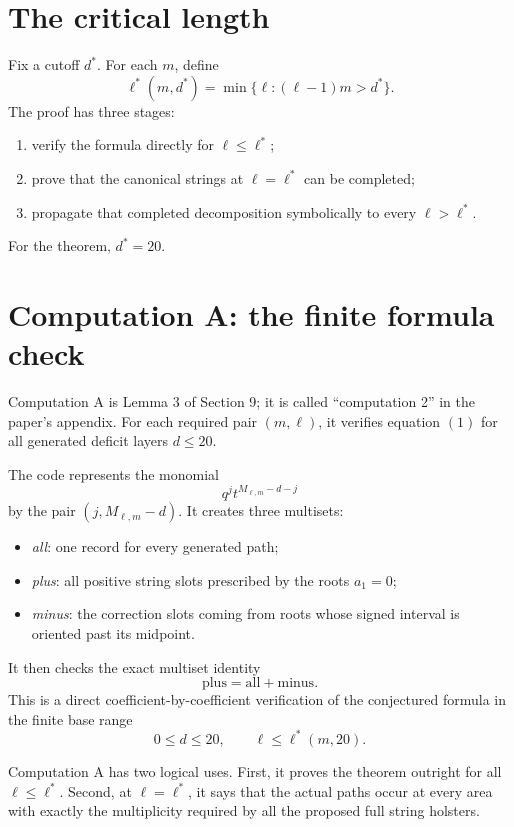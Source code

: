 \documentclass{article}
\begin{document}
\section{The critical length}

Fix a cutoff \(d^*\).  For each \(m\), define
\[
  \ell^*(m,d^*)
  =
  \min\{\ell:(\ell-1)m>d^*\}.
\]
The proof has three stages:
\begin{enumerate}
\item verify the formula directly for \(\ell\leq\ell^*\);
\item prove that the canonical strings at \(\ell=\ell^*\) can be completed;
\item propagate that completed decomposition symbolically to every
      \(\ell>\ell^*\).
\end{enumerate}
For the theorem, \(d^*=20\).

\section{Computation A: the finite formula check}

Computation A is Lemma 3 of Section 9; it is called ``computation 2'' in the
paper's appendix.  For each required pair \((m,\ell)\), it verifies equation
\((1)\) for all generated deficit layers \(d\leq20\).

The code represents the monomial
\[
  q^j t^{M_{\ell,m}-d-j}
\]
by the pair \((j,M_{\ell,m}-d)\).  It creates three multisets:
\begin{itemize}
\item \emph{all}: one record for every generated path;
\item \emph{plus}: all positive string slots prescribed by the roots
      \(a_1=0\);
\item \emph{minus}: the correction slots coming from roots whose signed
      interval is oriented past its midpoint.
\end{itemize}
It then checks the exact multiset identity
\[
  \text{plus}=\text{all}+\text{minus}.
  \tag{2}
\]
This is a direct coefficient-by-coefficient verification of the conjectured
formula in the finite base range
\[
  0\leq d\leq20,
  \qquad
  \ell\leq\ell^*(m,20).
\]

Computation A has two logical uses.  First, it proves the theorem outright for
all \(\ell\leq\ell^*\).  Second, at \(\ell=\ell^*\), it says that the actual
paths occur at every area with exactly the multiplicity required by all the
proposed full string holsters.
\end{document}
